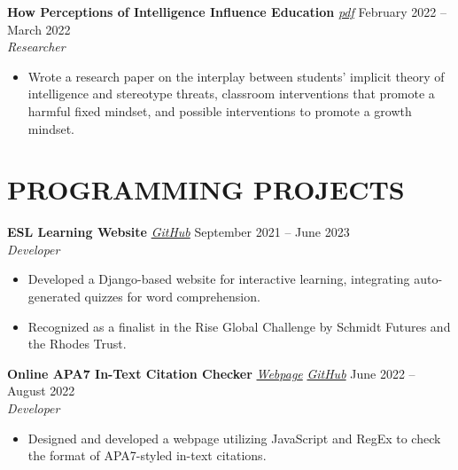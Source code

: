 \documentclass[letterpaper, 9pt]{extarticle}
\begin{document}
\noindent
\textbf{How Perceptions of Intelligence Influence Education} 
\emph{\href{https://drive.google.com/file/d/1lgQKk7_geC_NsAG5uHnPfWY3wKy38_-o/view?usp=sharing}{\color{blue} pdf}} 
\hfill February 2022 -- March 2022 \\
\textit{Researcher} 
\begin{itemize}
    \item Wrote a research paper on the interplay between students' implicit theory of intelligence and stereotype threats, classroom interventions that promote a harmful fixed mindset, and possible interventions to promote a growth mindset. 
\end{itemize}


\section*{PROGRAMMING PROJECTS}

\noindent
\textbf{ESL Learning Website} 
\emph{\href{https://github.com/AdenChen27/Project_0}{\color{blue} GitHub}}
\hfill September 2021 -- June 2023  \\
\textit{Developer}
\begin{itemize}
    \item Developed a Django-based website for interactive learning, integrating auto-generated quizzes for word comprehension. 
    \item Recognized as a finalist in the Rise Global Challenge by Schmidt Futures and the Rhodes Trust.
\end{itemize}

\noindent
\textbf{Online APA7 In-Text Citation Checker} \emph{\href{https://adenchen27.github.io/citation_checker/main.html}{\color{blue} Webpage}}
\emph{\href{https://github.com/AdenChen27/AdenChen27.github.io/tree/main/citation_checker}{\color{blue} GitHub}}
\hfill June 2022 -- August 2022 \\
\textit{Developer} 
\begin{itemize}
    \item Designed and developed a webpage utilizing JavaScript and RegEx to check the format of APA7-styled in-text citations.
\end{itemize}
\end{document}
